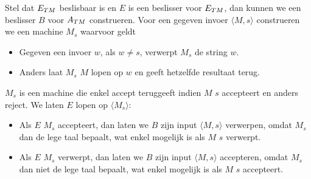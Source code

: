   Stel dat ${E_{TM}}$ beslisbaar is en $E$ is een beslisser voor ${E_{TM}}$, dan kunnen we een beslisser $B$ voor ${A_{TM}}$ construeren. Voor een gegeven invoer $\langle M,s \rangle$ construeren we een machine $M_s$ waarvoor geldt
  \begin{itemize}
  \item Gegeven een invoer $w$, als $w \neq s$, verwerpt $M_s$ de string $w$.
  \item Anders laat $M_s$ $M$ lopen op $w$ en geeft hetzelfde resultaat terug.
  \end{itemize}
  $M_s$ is een machine die enkel accept teruggeeft indien $M$ $s$ accepteert en anders reject. We laten $E$ lopen op $\langle M_s \rangle$:
  \begin{itemize}
  \item Als $E$ $M_s$ accepteert, dan laten we $B$ zijn input $\langle M,s \rangle$ verwerpen, omdat $M_s$ dan de lege taal bepaalt, wat enkel mogelijk is als $M$ $s$ verwerpt.
  \item Als $E$ $M_s$ verwerpt, dan laten we $B$ zijn input $\langle M,s \rangle$ accepteren, omdat $M_s$ dan niet de lege taal bepaalt, wat enkel mogelijk is als $M$ $s$ accepteert.
  \end{itemize}